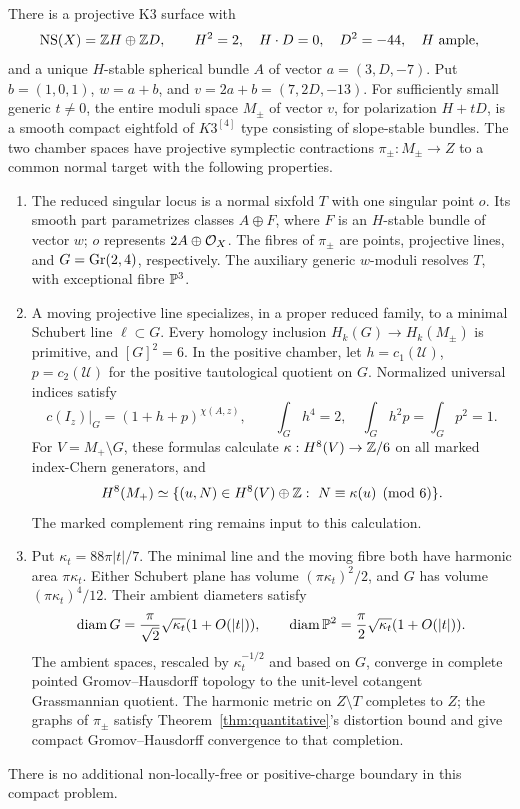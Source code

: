 \begin{theorem}\label{thm:main}
There is a projective K3 surface with
\[
 \operatorname{NS}(X)=\mathbb Z H\oplus\mathbb Z D,\qquad H^2=2,\quad H\cdot D=0,\quad
 D^2=-44,\quad H\text{ ample},
\]
and a unique \(H\)-stable spherical bundle \(A\) of vector
\(a=(3,D,-7)\). Put \(b=(1,0,1)\), \(w=a+b\),
and \(v=2a+b=(7,2D,-13)\).
For sufficiently small generic \(t\ne0\), the entire moduli
space \(M_\pm\) of vector \(v\), for polarization \(H+tD\),
is a smooth compact eightfold of \(K3^{[4]}\) type consisting
of slope-stable bundles. The two chamber spaces have projective
symplectic contractions \(\pi_\pm:M_\pm\to Z\) to a common
normal target with the following properties.

\begin{enumerate}
\item The reduced singular locus is a normal sixfold \(T\)
with one singular point \(o\). Its smooth part parametrizes
classes \(A\oplus F\), where \(F\) is an \(H\)-stable bundle
of vector \(w\); \(o\) represents \(2A\oplus\mathcal O_X\).
The fibres of \(\pi_\pm\) are points, projective lines, and
\(G=\operatorname{Gr}(2,4)\), respectively.
The auxiliary generic \(w\)-moduli resolves \(T\), with
exceptional fibre \(\mathbb P^3\).

\item A moving projective line specializes, in a proper reduced
family, to a minimal Schubert line \(\ell\subset G\).
Every homology inclusion \(H_k(G)\to H_k(M_\pm)\) is primitive,
and \([G]^2=6\). In the positive chamber, let
\(h=c_1(\mathcal U)\), \(p=c_2(\mathcal U)\) for the positive
tautological quotient on \(G\). Normalized universal indices
satisfy
\[
 c(I_z)|_G=(1+h+p)^{\chi(A,z)},\qquad
 \int_Gh^4=2,\quad\int_Gh^2p=\int_Gp^2=1 .
\]
For \(V=M_+\setminus G\), these formulas calculate
\(\kappa:H^8(V)\to\mathbb Z/6\) on all marked index-Chern generators,
and
\[
 H^8(M_+)\simeq
 \{(u,N)\in H^8(V)\oplus\mathbb Z:\ N\equiv\kappa(u)\pmod6\}.
\]
The marked complement ring remains input to this calculation.

\item Put \(\kappa_t=88\pi|t|/7\).
The minimal line and the moving fibre both have harmonic area
\(\pi\kappa_t\). Either Schubert plane has volume
\((\pi\kappa_t)^2/2\), and \(G\) has volume
\((\pi\kappa_t)^4/12\). Their ambient diameters satisfy
\[
 \operatorname{diam} G=\frac{\pi}{\sqrt2}\sqrt{\kappa_t}(1+O(|t|)),\qquad
 \operatorname{diam}\mathbb P^2=\frac{\pi}{2}\sqrt{\kappa_t}(1+O(|t|)).
\]
The ambient spaces, rescaled by \(\kappa_t^{-1/2}\) and based
on \(G\), converge in complete pointed Gromov--Hausdorff
topology to the unit-level cotangent Grassmannian quotient.
The harmonic metric on \(Z\setminus T\) completes to \(Z\);
the graphs of \(\pi_\pm\) satisfy
Theorem~\ref{thm:quantitative}'s distortion bound and give
compact Gromov--Hausdorff convergence to that completion.
\end{enumerate}
There is no additional non-locally-free or positive-charge
boundary in this compact problem.
\end{theorem}

